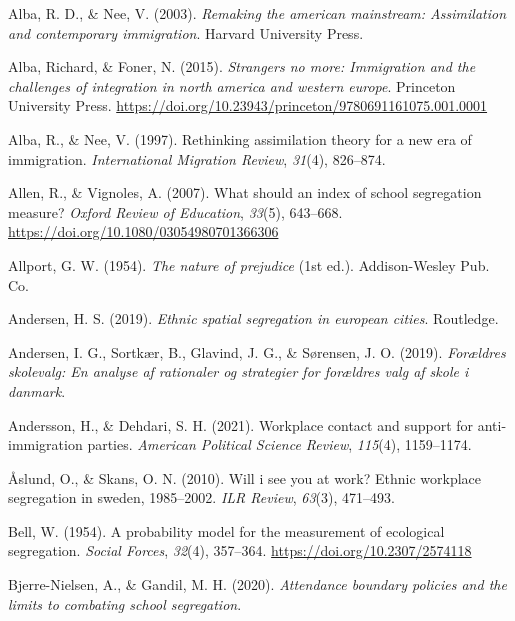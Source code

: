 \documentclass[
]{book}
\newlength{\cslhangindent}
\newenvironment{CSLReferences}[2] %
 {\begin{list}{}{%
  \setlength{\itemindent}{0pt}
  \setlength{\leftmargin}{0pt}
  \setlength{\parsep}{0pt}
  \ifodd #1
   \setlength{\leftmargin}{\cslhangindent}
   \setlength{\itemindent}{-1\cslhangindent}
  \fi
  \setlength{\itemsep}{#2\baselineskip}}}
 {\end{list}}
\begin{document}
\label{refs}
\begin{CSLReferences}{1}{0}
Alba, R. D., \& Nee, V. (2003). \emph{Remaking the american mainstream: Assimilation and contemporary immigration}. Harvard University Press.

Alba, Richard, \& Foner, N. (2015). \emph{Strangers no more: Immigration and the challenges of integration in north america and western europe}. Princeton University Press. \url{https://doi.org/10.23943/princeton/9780691161075.001.0001}

Alba, R., \& Nee, V. (1997). Rethinking assimilation theory for a new era of immigration. \emph{International Migration Review}, \emph{31}(4), 826--874.

Allen, R., \& Vignoles, A. (2007). What should an index of school segregation measure? \emph{Oxford Review of Education}, \emph{33}(5), 643--668. \url{https://doi.org/10.1080/03054980701366306}

Allport, G. W. (1954). \emph{The nature of prejudice} (1st ed.). Addison-Wesley Pub. Co.

Andersen, H. S. (2019). \emph{Ethnic spatial segregation in european cities}. Routledge.

Andersen, I. G., Sortkær, B., Glavind, J. G., \& Sørensen, J. O. (2019). \emph{Forældres skolevalg: En analyse af rationaler og strategier for forældres valg af skole i danmark}.

Andersson, H., \& Dehdari, S. H. (2021). Workplace contact and support for anti-immigration parties. \emph{American Political Science Review}, \emph{115}(4), 1159--1174.

Åslund, O., \& Skans, O. N. (2010). Will i see you at work? Ethnic workplace segregation in sweden, 1985--2002. \emph{ILR Review}, \emph{63}(3), 471--493.

Bell, W. (1954). A probability model for the measurement of ecological segregation. \emph{Social Forces}, \emph{32}(4), 357--364. \url{https://doi.org/10.2307/2574118}

Bjerre-Nielsen, A., \& Gandil, M. H. (2020). \emph{Attendance boundary policies and the limits to combating school segregation}.


\end{CSLReferences}
\end{document}
